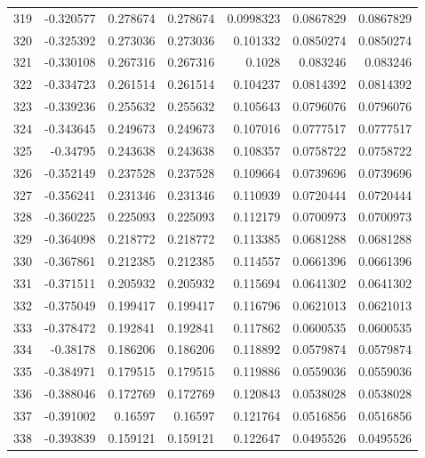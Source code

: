 \begin{tabular}{rrrrrrr}
 319 & -0.320577    & 0.278674    & 0.278674    &  0.0998323   & 0.0867829   & 0.0867829   \\
 320 & -0.325392    & 0.273036    & 0.273036    &  0.101332    & 0.0850274   & 0.0850274   \\
 321 & -0.330108    & 0.267316    & 0.267316    &  0.1028      & 0.083246    & 0.083246    \\
 322 & -0.334723    & 0.261514    & 0.261514    &  0.104237    & 0.0814392   & 0.0814392   \\
 323 & -0.339236    & 0.255632    & 0.255632    &  0.105643    & 0.0796076   & 0.0796076   \\
 324 & -0.343645    & 0.249673    & 0.249673    &  0.107016    & 0.0777517   & 0.0777517   \\
 325 & -0.34795     & 0.243638    & 0.243638    &  0.108357    & 0.0758722   & 0.0758722   \\
 326 & -0.352149    & 0.237528    & 0.237528    &  0.109664    & 0.0739696   & 0.0739696   \\
 327 & -0.356241    & 0.231346    & 0.231346    &  0.110939    & 0.0720444   & 0.0720444   \\
 328 & -0.360225    & 0.225093    & 0.225093    &  0.112179    & 0.0700973   & 0.0700973   \\
 329 & -0.364098    & 0.218772    & 0.218772    &  0.113385    & 0.0681288   & 0.0681288   \\
 330 & -0.367861    & 0.212385    & 0.212385    &  0.114557    & 0.0661396   & 0.0661396   \\
 331 & -0.371511    & 0.205932    & 0.205932    &  0.115694    & 0.0641302   & 0.0641302   \\
 332 & -0.375049    & 0.199417    & 0.199417    &  0.116796    & 0.0621013   & 0.0621013   \\
 333 & -0.378472    & 0.192841    & 0.192841    &  0.117862    & 0.0600535   & 0.0600535   \\
 334 & -0.38178     & 0.186206    & 0.186206    &  0.118892    & 0.0579874   & 0.0579874   \\
 335 & -0.384971    & 0.179515    & 0.179515    &  0.119886    & 0.0559036   & 0.0559036   \\
 336 & -0.388046    & 0.172769    & 0.172769    &  0.120843    & 0.0538028   & 0.0538028   \\
 337 & -0.391002    & 0.16597     & 0.16597     &  0.121764    & 0.0516856   & 0.0516856   \\
 338 & -0.393839    & 0.159121    & 0.159121    &  0.122647    & 0.0495526   & 0.0495526   \\

\end{tabular}
